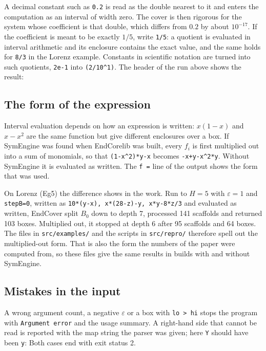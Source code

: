 \documentclass[11pt,a4paper]{article}
\newcommand{\out}[2][]{\VerbatimInput[fontsize=\footnotesize,#1]{#2}}
\newcommand{\file}[1]{\nolinkurl{#1}}
\newcommand{\eps}{\varepsilon}
\begin{document}
A decimal constant such as \verb|0.2| is read as the double nearest to it
and enters the computation as an interval of width zero. The cover is then
rigorous for the system whose coefficient is that double, which differs from
$0.2$ by about $10^{-17}$. If the coefficient is meant to be exactly $1/5$,
write \verb|1/5|: a quotient is evaluated in interval arithmetic and its
enclosure contains the exact value, and the same holds for \verb|8/3| in the
Lorenz example. Constants in scientific notation are turned into such
quotients, \verb|2e-1| into \verb|(2/10^1)|. The header of the run above
shows the result:
\out[firstline=2]{out/sci.txt}

\subsection{The form of the expression}\label{sec:form}

Interval evaluation depends on how an expression is written: $x(1-x)$ and
$x - x^2$ are the same function but give different enclosures over a box.
If SymEngine was found when EndCorelib was built, every $f_i$ is first
multiplied out into a sum of monomials, so that \verb|(1-x^2)*y-x| becomes
\verb|-x+y-x^2*y|. Without SymEngine it is evaluated as written. The
\verb|f =| line of the output shows the form that was used.

On Lorenz (Eg5) the difference shows in the work. Run to $H = 5$ with
$\eps = 1$ and \texttt{stepB=0}, written as
\verb|10*(y-x), x*(28-z)-y, x*y-8*z/3| and evaluated as written, EndCover
split $B_0$ down to depth 7, processed 141 scaffolds and returned 103 boxes.
Multiplied out, it stopped at depth 6 after 95 scaffolds and 64 boxes. The
files in \file{src/examples/} and the scripts in \file{src/repro/} therefore
spell out the multiplied-out form.
That is also the form the numbers of the paper were computed from, so these
files give the same results in builds with and without SymEngine.

\subsection{Mistakes in the input}

A wrong argument count, a negative $\eps$ or a box with \verb|lo > hi| stops
the program with \texttt{Argument error} and the usage summary. A right-hand
side that cannot be read is reported with the map string the parser was
given; here \verb|Y| should have been \verb|y|:
\out{out/parse_error.txt}
Both cases end with exit status 2.
\end{document}
